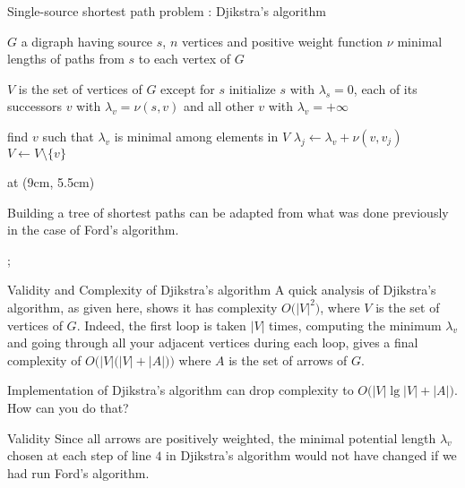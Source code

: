 \documentclass[32pt,aspectratio=169]{beamer}
\begin{document}
\begin{frame}{Single-source shortest path problem : Djikstra's algorithm}
  \small{
    \begin{algorithmic}[1]
      \Require $G$ a digraph having source $s$, $n$
      vertices and positive weight function $\nu$
      \Ensure minimal lengths of paths from $s$ to each vertex of $G$

      \State $V$ is the set of vertices of $G$ except for $s$
      \State initialize $s$ with $\lambda_s =0$, each of its
      successors $v$ with $\lambda_v = \nu(s, v)$
      \Statex and all other $v$ with $\lambda_v = +\infty$

      \State find $v$ such that $\lambda_v$ is minimal among elements in $V$
      \State $\lambda_j \gets \lambda_v + \nu(v, v_j)$
      \EndIf
      \EndFor
      \State $V \gets V\setminus \{v\}$
      \EndWhile

    \end{algorithmic}
  }
  \tikzoverlay[text width=5cm] at (9cm, 5.5cm) {
    \begin{tcolorbox}[
      enhanced,
      parbox = false,
      colback=mLightBrown!10!white,
      colframe=mLightBrown,
      arc=0mm,
      ]
      Building a tree of shortest paths can be adapted from what was
      done previously in the case of Ford's algorithm.
    \end{tcolorbox}%
  };
\end{frame}

\begin{frame}{Validity and Complexity of Djikstra's algorithm}
  A quick analysis of Djikstra's algorithm, as given here, shows it
  has complexity $O\big(|V|^2\big)$, where $V$ is the set of vertices
  of $G$. Indeed, the first loop is taken $|V|$ times, computing the
  minimum $\lambda_v$ and going through all your adjacent vertices
  during each loop, gives a final complexity of
  $O\Big(|V|\big(|V|+|A|\big)\Big)$ where $A$ is the set of arrows of
  $G$.
  \begin{rem}
    Implementation of Djikstra's algorithm can drop complexity to
    $O\big(|V|\lg|V| + |A|\big)$. How can you do that?
  \end{rem}
  \begin{halfshyblock}{Validity}
    Since all arrows are positively weighted, the minimal potential
    length $\lambda_v$ chosen at each step of line $4$ in Djikstra's
    algorithm would not have changed if we had run Ford's algorithm.
  \end{halfshyblock}
\end{frame}
\end{document}
